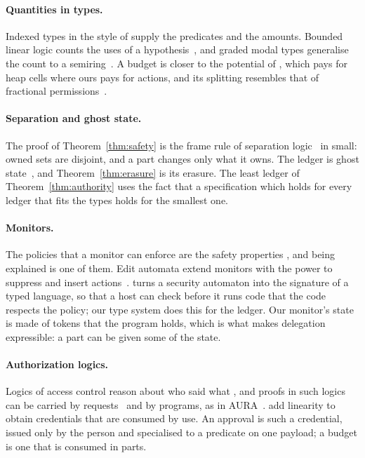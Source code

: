 \documentclass[acmsmall,nonacm,screen]{acmart}
\begin{document}
\paragraph{Quantities in types.} Indexed types in the style of \citet{xi1999} supply the
predicates and the amounts. Bounded linear logic counts the uses of a
hypothesis~\citep{girard1992}, and graded modal types generalise the count to a
semiring~\citep{orchard2019}. A budget is closer to the potential of \citet{hofmann2003}, which
pays for heap cells where ours pays for actions, and its splitting resembles that of fractional
permissions~\citep{boyland2003}.

\paragraph{Separation and ghost state.} The proof of Theorem~\ref{thm:safety} is the frame
rule of separation logic~\citep{reynolds2002} in small: owned sets are disjoint, and a part
changes only what it owns. The ledger is ghost state~\citep{jung2018}, and
Theorem~\ref{thm:erasure} is its erasure. The least ledger of Theorem~\ref{thm:authority} uses
the fact that a specification which holds for every ledger that fits the types holds for the
smallest one.

\paragraph{Monitors.} The policies that a monitor can enforce are the safety properties
\citep{schneider2000}, and being explained is one of them. Edit automata extend monitors with
the power to suppress and insert actions~\citep{ligatti2005}. \citet{walker2000} turns a security
automaton into the signature of a typed language, so that a host can check before it runs code
that the code respects the policy; our type system does this for the ledger. Our monitor's state is
made of tokens that the program holds, which is what makes delegation expressible: a part can
be given some of the state.

\paragraph{Authorization logics.} Logics of access control reason about who said what
\citep{abadi1993}, and proofs in such logics can be carried by requests~\citep{appel1999} and
by programs, as in AURA~\citep{jia2008}. \citet{garg2006} add linearity to obtain credentials
that are consumed by use. An approval is such a credential, issued only by the person and
specialised to a predicate on one payload; a budget is one that is consumed in parts.
\end{document}
